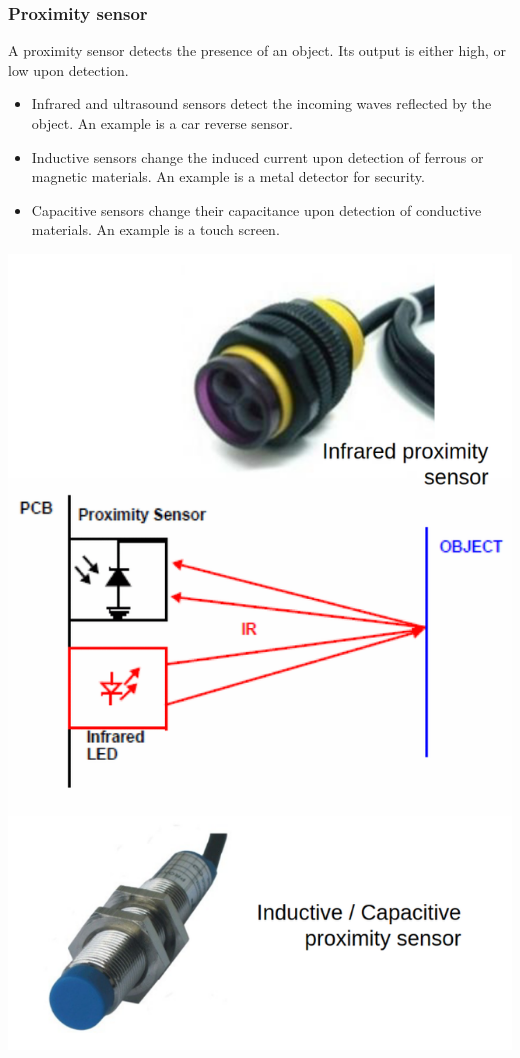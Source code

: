 \documentclass[11pt]{article}
\begin{document}
 \newpage
\subsubsection{Proximity sensor}
\label{sec:org73ed288}
A proximity sensor detects the presence of an object. Its output is either high, or low upon detection.
\begin{itemize}
\item Infrared and ultrasound sensors detect the incoming waves reflected by the object. An example is a car reverse sensor.
\item Inductive sensors change the induced current upon detection of ferrous or magnetic materials. An example is a metal detector for security.
\item Capacitive sensors change their capacitance upon detection of conductive materials. An example is a touch screen.
\end{itemize}

\begin{center}
\includegraphics[scale=0.7]{./images/proximity-sensors.png}
\end{center}
\end{document}
